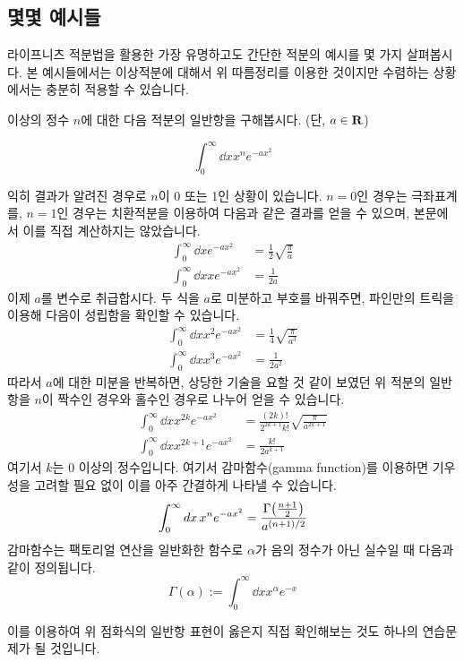 \documentclass[11pt]{book}
\begin{document}
\subsection{몇몇 예시들}
\begin{MLPar}
라이프니츠 적분법을 활용한 가장 유명하고도 간단한 적분의 예시를 몇 가지 살펴봅시다.
본 예시들에서는 이상적분에 대해서 위 따름정리를 이용한 것이지만 수렴하는 상황에서는 충분히 적용할 수 있습니다.

 이상의 정수 $n$에 대한 다음 적분의 일반항을 구해봅시다.
(단, $a \in \mbox{$\mathbf R$}$)

\[\int_{0}^{\infty}\dd{x} x^n e^{-ax^2}\]

익히 결과가 알려진 경우로 $n$이 0 또는 1인 상황이 있습니다.
$n=0$인 경우는 극좌표계를, $n=1$인 경우는 치환적분을 이용하여 다음과 같은 결과를 얻을 수 있으며, 본문에서 이를 직접 계산하지는 않았습니다.
\begin{align*}
    \int_{0}^{\infty} \dd{x} e^{-ax^2} &= \frac{1}{2} \sqrt{\frac{\pi}{a}} \\
    \int_{0}^{\infty} \dd{x} x e^{-ax^2} &= \frac{1}{2a}
\end{align*}
이제 $a$를 변수로 취급합시다.
두 식을 $a$로 미분하고 부호를 바꿔주면, 파인만의 트릭을 이용해 다음이 성립함을 확인할 수 있습니다.
\begin{align*}
    \int_{0}^{\infty} \dd{x} x^2 e^{-ax^2} &= \frac{1}{4} \sqrt{\frac{\pi}{a^3}} \\
    \int_{0}^{\infty} \dd{x} x^3 e^{-ax^2} &= \frac{1}{2a^2}
\end{align*}
따라서 $a$에 대한 미분을 반복하면, 상당한 기술을 요할 것 같이 보였던 위 적분의 일반항을 $n$이 짝수인 경우와 홀수인 경우로 나누어 얻을 수 있습니다.
\begin{align*}
    \int_{0}^{\infty}\dd{x} x^{2k} e^{-ax^2} &= \frac{(2k)!}{2^{2k+1} k!} \sqrt{\frac{\pi}{a^{2k+1}}}\\
    \int_{0}^{\infty}\dd{x} x^{2k+1} e^{-ax^2} &= \frac{k!}{2a^{k+1}}
\end{align*}
여기서 $k$는 0 이상의 정수입니다.
여기서 감마함수{\small (gamma function)}를 이용하면 기우성을 고려할 필요 없이 이를 아주 간결하게 나타낼 수 있습니다.
\[\int_{0}^{\infty}\dd{x} x^n e^{-ax^2} = \frac{\Gamma \pqty{\frac{n+1}{2}}}{a^{(n+1)/2}}\]
감마함수는 팩토리얼 연산을 일반화한 함수로 $\alpha$가 음의 정수가 아닌 실수일 때 다음과 같이 정의됩니다.
\[\Gamma (\alpha) := \int_{0}^{\infty}\dd{x} x^{\alpha} e^{-x}\]

이를 이용하여 위 점화식의 일반항 표현이 옳은지 직접 확인해보는 것도 하나의 연습문제가 될 것입니다.


\end{MLPar}
\end{document}
